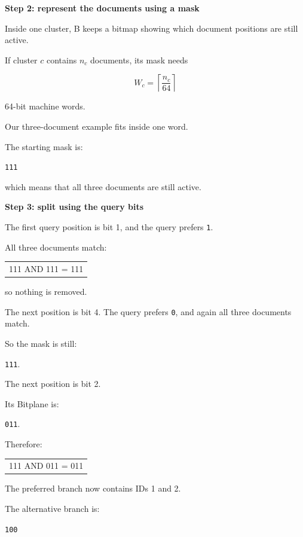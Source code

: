 \textbf{Step 2: represent the documents using a mask}\par

Inside one cluster, B keeps a bitmap showing which document positions are still active.

If cluster \(c\) contains \(n_c\) documents, its mask needs

\[
\boxed{
W_c=
\left\lceil
\frac{n_c}{64}
\right\rceil
}
\]

64-bit machine words.

Our three-document example fits inside one word.

The starting mask is:

\texttt{111}

which means that all three documents are still active.



\textbf{Step 3: split using the query bits}\par

The first query position is bit 1, and the query prefers \texttt{1}.

All three documents match:

\begin{center}\begingroup\small\ttfamily\begin{tabular}{l}
111 AND 111 = 111
\end{tabular}\endgroup\end{center}

so nothing is removed.

The next position is bit 4. The query prefers \texttt{0}, and again all three documents match.

So the mask is still:

\texttt{111}.

The next position is bit 2.

Its Bitplane is:

\texttt{011}.

Therefore:

\begin{center}\begingroup\small\ttfamily\begin{tabular}{l}
111 AND 011 = 011
\end{tabular}\endgroup\end{center}

The preferred branch now contains IDs 1 and 2.

The alternative branch is:

\texttt{100}

